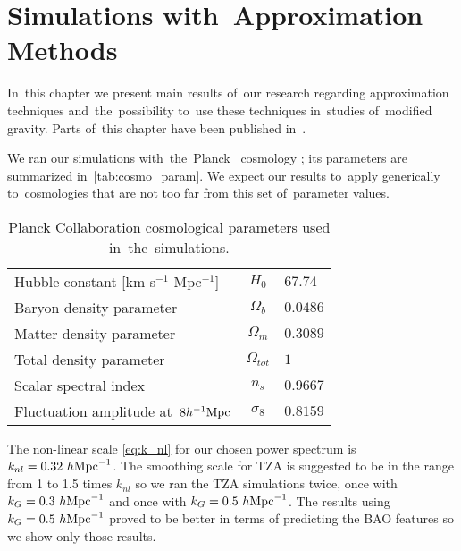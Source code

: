 \chapter{Simulations with~Approximation Methods}
\label{chpt:app_sims}
In~this chapter we present main results of~our research regarding approximation techniques and~the~possibility to~use these techniques in~studies of~modified gravity. Parts of~this chapter have been published in~\textcite{2020MNRAS.493.2085V}.

We ran our simulations with~the~Planck \LCDM\ cosmology \parencite{planck_cosm}; its parameters are summarized in~\autoref{tab:cosmo_param}. We expect our results to~apply generically to~cosmologies that are not too far from this set of~parameter values.
\begin{table}[!b]
\centering
\begin{tabular}{ l c l }
  \hline \hline
  Hubble constant  [km s$^{-1}$ Mpc$^{-1}$] & $H_0$ & $67.74$ \\
  Baryon density parameter & $\Omega_b$ & $0.0486$ \\
  Matter density parameter & $\Omega_m$ & $0.3089$ \\
  Total density parameter & $\Omega_{tot}$ & $1$ \\
  Scalar spectral index & $n_s$ & $0.9667$ \\
  Fluctuation amplitude at~$8h^{-1}\text{Mpc}$ & $\sigma_8$ & $0.8159$ \\
  \hline \hline
\end{tabular}
\caption{Planck Collaboration cosmological parameters \parencite{planck_cosm} used in~the~simulations.}
\label{tab:cosmo_param}
\end{table}
The non-linear scale \eqref{eq:k_nl} for our chosen power spectrum is $k_{nl}=0.32~h\text{Mpc}^{-1}$. The smoothing scale for TZA is suggested to be in the range from 1 to 1.5 times $k_{nl}$ so we ran the TZA simulations twice, once with $k_G=0.3~h\text{Mpc}^{-1}$ and once with $k_G=0.5~h\text{Mpc}^{-1}$. The results using $k_G=0.5~h\text{Mpc}^{-1}$ proved to be better in terms of predicting the BAO features so we show only those results.

